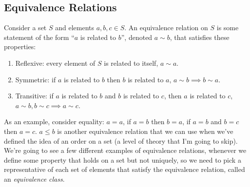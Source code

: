 \documentclass[./analysis.tex]{subfiles}
\begin{document}
\subsection{Equivalence Relations}
Consider a set $S$ and elements $a, b, c \in S$. An equivalence relation on $S$ is some statement of the form ``$a$ is related to $b$'', denoted $a \sim b$, that satisfies these properties:

\begin{enumerate}
    \item Reflexive: every element of $S$ is related to itself, $a \sim a$.
    \item Symmetric: if $a$ is related to $b$ then $b$ is related to $a$, $a \sim b \implies b \sim a$.
    \item Transitive: if $a$ is related to $b$ and $b$ is related to $c$, then $a$ is related to $c$, $a \sim b, b \sim c \implies a \sim c$.
\end{enumerate}

As an example, consider equality: $a = a$, if $a = b$ then $b = a$, if $a = b$ and $b = c$ then $a = c$. $a \leq b$ is another equivalence relation that we can use when we've defined the idea of an order on a set (a level of theory that I'm going to skip). We're going to see a few different examples of equivalence relations, whenever we define some property that holds on a set but not uniquely, so we need to pick a representative of each set of elements that satisfy the equivalence relation, called an \emph{equivalence class}.
\end{document}
